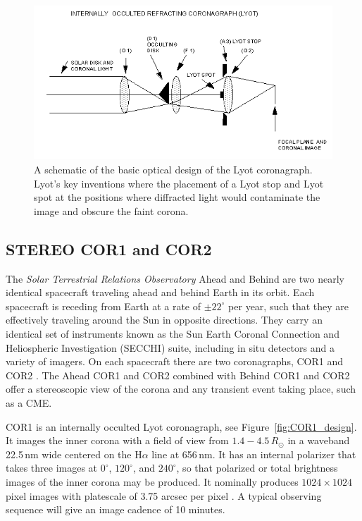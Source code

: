 \begin{figure}[!h]
\begin{center}
\includegraphics[trim=0cm 1.0cm 0cm 0cm, scale=0.8]{images/Lyot_coronagraph}
\caption{A schematic of the basic optical design of the Lyot coronagraph. Lyot's key inventions where the placement of a Lyot stop and Lyot spot at the positions where diffracted light would contaminate the image and obscure the faint corona.}
\label{fig:lyot}
\end{center}
\end{figure}

\subsection{STEREO COR1 and COR2}\label{sec:22}
The \emph{Solar Terrestrial Relations Observatory} \citep[\emph{STEREO};][]{kai08} Ahead and Behind are two nearly identical spacecraft traveling ahead and behind Earth in its orbit. Each spacecraft is receding from Earth at a rate of $\pm22^{\circ}$ per year, such that they are effectively traveling around the Sun in opposite directions. They carry an identical set of instruments known as the Sun Earth Coronal Connection and Heliospheric Investigation (SECCHI) suite, including in situ detectors and a variety of imagers. On each spacecraft there are two coronagraphs, COR1 and COR2 \citep{how08}. The Ahead COR1 and COR2 combined with Behind COR1 and COR2 offer a stereoscopic view of the corona and any transient event taking place, such as a CME.

COR1 is an internally occulted Lyot coronagraph, see Figure~\ref{fig:COR1_design}. It images the inner corona with a field of view from $1.4 - 4.5\,R_{\odot}$ in a waveband 22.5\,nm wide centered on the H$\alpha$ line at 656\,nm. It has an internal polarizer that takes three images at $0^{\circ}$, $120^{\circ}$, and $240^{\circ}$, so that polarized or total brightness images of the inner corona may be produced. It nominally produces $1024\times1024$ pixel images with platescale of 3.75 arcsec per pixel \citep{thomp2008}. A typical observing sequence will give an image cadence of 10 minutes.

